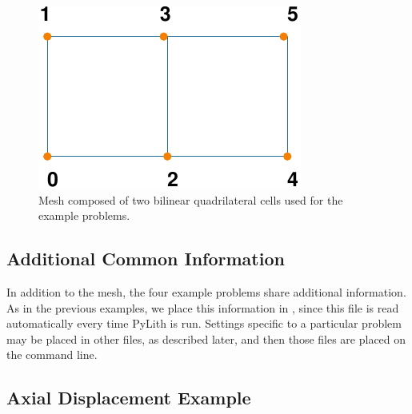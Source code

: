\begin{figure}
  \includegraphics{examples/figs/twoquad4-mesh}
  \caption{Mesh composed of two bilinear quadrilateral cells used for
    the example problems.}
  \label{fig:twoquad4-mesh}
\end{figure}


\subsection{Additional Common Information}

In addition to the mesh, the four example problems share additional
information. As in the previous examples, we place this information
in , since this file is read automatically every
time PyLith is run. Settings specific to a particular problem may
be placed in other  files, as described later, and then
those files are placed on the command line.


\subsection{Axial Displacement Example}

